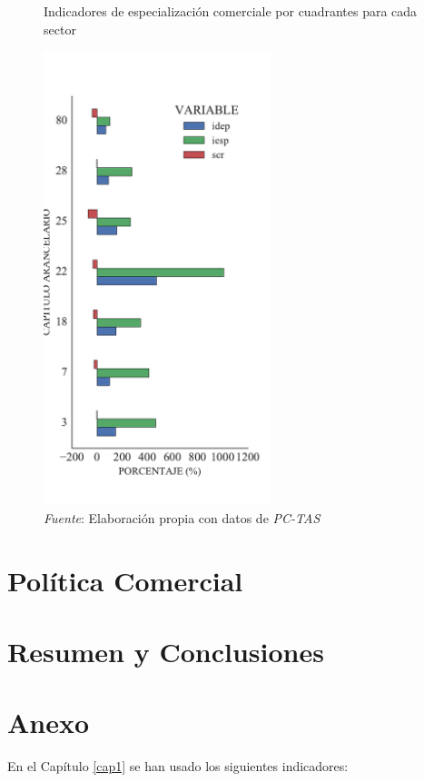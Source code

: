 \documentclass[a4paper,openright,12pt]{book}
\begin{document}
\begin{figure}[ht]
    \centering
    \caption{Indicadores de especialización comerciale por cuadrantes para cada sector}
    \includegraphics[width=250px]{esp_c4.pdf}
    \caption*{\textit{Fuente}: Elaboración propia con datos de \textit{PC-TAS}}
    \label{esp_c4}
\end{figure}

\chapter{Política Comercial}

\chapter{Resumen y Conclusiones}


\chapter{Anexo}

En el Capítulo \ref{cap1} se han usado los siguientes indicadores:
\end{document}
